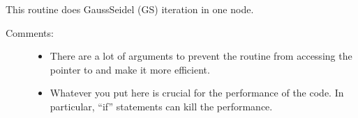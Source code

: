 \documentclass[letterpaper,10pt,english]{sphinxmanual}
\begin{document}
\begin{fulllineitems}
\label{\detokenize{sphinx-c-apidoc/output/gravity/mond_mass/gs_residual_truncation_error_mm_c:c.gs_node_mm}}%
\pysigstartmultiline
{}%
\pysigstopmultiline
This routine does Gauss\sphinxhyphen{}Seidel (GS) iteration in one node.
\begin{description}
\item[{Comments:}] \leavevmode\begin{itemize}
\item {} 
There are a lot of arguments to prevent the routine from accessing the pointer to 
and make it more efficient.

\item {} 
Whatever you put here is crucial for the performance of the code.  In particular, “if” statements can kill the performance.

\end{itemize}

\end{description}

\end{fulllineitems}

\end{document}
